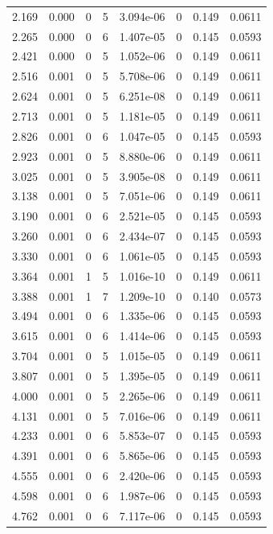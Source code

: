 \documentclass[preview]{standalone}
\begin{document}
{{\begin{tabular}{L{1.2cm}C{1.2cm} C{0.3cm}C{0.5cm} C{1.4cm}C{1.4cm} C{1.4cm}C{1.4cm}}
  2.169  &  0.000  & 0     &  5 &  3.094e-06  & 0  & 0.149 &  0.0611   \\ 
  2.265  &  0.000  & 0     &  6 &  1.407e-05  & 0  & 0.145 &  0.0593   \\ 
  2.421  &  0.000  & 0     &  5 &  1.052e-06  & 0  & 0.149 &  0.0611   \\ 
  2.516  &  0.001  & 0     &  5 &  5.708e-06  & 0  & 0.149 &  0.0611   \\ 
  2.624  &  0.001  & 0     &  5 &  6.251e-08  & 0  & 0.149 &  0.0611   \\ 
  2.713  &  0.001  & 0     &  5 &  1.181e-05  & 0  & 0.149 &  0.0611   \\ 
  2.826  &  0.001  & 0     &  6 &  1.047e-05  & 0  & 0.145 &  0.0593   \\ 
  2.923  &  0.001  & 0     &  5 &  8.880e-06  & 0  & 0.149 &  0.0611   \\ 
  3.025  &  0.001  & 0     &  5 &  3.905e-08  & 0  & 0.149 &  0.0611   \\ 
  3.138  &  0.001  & 0     &  5 &  7.051e-06  & 0  & 0.149 &  0.0611   \\ 
  3.190  &  0.001  & 0     &  6 &  2.521e-05  & 0  & 0.145 &  0.0593   \\ 
  3.260  &  0.001  & 0     &  6 &  2.434e-07  & 0  & 0.145 &  0.0593   \\ 
  3.330  &  0.001  & 0     &  6 &  1.061e-05  & 0  & 0.145 &  0.0593   \\ 
  3.364  &  0.001  & 1     &  5 &  1.016e-10  & 0  & 0.149 &  0.0611   \\ 
  3.388  &  0.001  & 1     &  7 &  1.209e-10  & 0  & 0.140 &  0.0573   \\ 
  3.494  &  0.001  & 0     &  6 &  1.335e-06  & 0  & 0.145 &  0.0593   \\ 
  3.615  &  0.001  & 0     &  6 &  1.414e-06  & 0  & 0.145 &  0.0593   \\ 
  3.704  &  0.001  & 0     &  5 &  1.015e-05  & 0  & 0.149 &  0.0611   \\ 
  3.807  &  0.001  & 0     &  5 &  1.395e-05  & 0  & 0.149 &  0.0611   \\ 
  4.000  &  0.001  & 0     &  5 &  2.265e-06  & 0  & 0.149 &  0.0611   \\ 
  4.131  &  0.001  & 0     &  5 &  7.016e-06  & 0  & 0.149 &  0.0611   \\ 
  4.233  &  0.001  & 0     &  6 &  5.853e-07  & 0  & 0.145 &  0.0593   \\ 
  4.391  &  0.001  & 0     &  6 &  5.865e-06  & 0  & 0.145 &  0.0593   \\ 
  4.555  &  0.001  & 0     &  6 &  2.420e-06  & 0  & 0.145 &  0.0593   \\ 
  4.598  &  0.001  & 0     &  6 &  1.987e-06  & 0  & 0.145 &  0.0593   \\ 
  4.762  &  0.001  & 0     &  6 &  7.117e-06  & 0  & 0.145 &  0.0593   \\ 
\hline 
\end{tabular} 

}}
\end{document}

